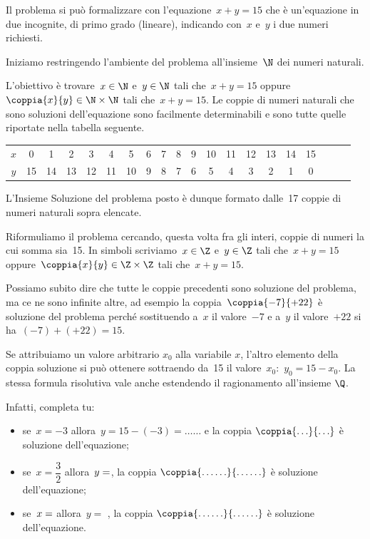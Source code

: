 \begin{soluzione}
Il problema si può formalizzare con l'equazione~\(x+y=15\) che è 
un'equazione in due incognite, di primo grado (lineare), 
indicando con~\(x\) e~\(y\) i due numeri richiesti.

Iniziamo restringendo l'ambiente del problema all'insieme~\(\N\) dei numeri 
naturali.

L'obiettivo è trovare~\(x\in\N\) e~\(y\in\N\) tali che~\(x+y=15\) 
oppure~\(\coppia{x}{y}\in\N\times\N\) tali che~\(x+y=15\).
Le coppie di numeri naturali che sono soluzioni
dell'equazione sono facilmente determinabili e sono
tutte quelle riportate nella tabella seguente.

{\small
\begin{tabular}{cccccccccccccccccccc}
\toprule
\(x\) & 0 & 1 & 2 & 3 & 4 & 5 & 6 & 7 & 8 & 9 & 10 & 11 & 12 & 13 & 
14 & 15\\
\(y\) & 15 & 14 & 13 & 12 & 11 & 10 & 9 & 8 & 7 & 6 & 5 & 4 & 3 & 
2 & 1 & 0\\
\bottomrule
\end{tabular}
}

L'Insieme Soluzione del problema posto è dunque
formato dalle~17 coppie di numeri naturali sopra elencate.

Riformuliamo il problema cercando, questa volta fra gli interi,
coppie di numeri la cui somma sia~15.
In simboli scriviamo~\(x\in\Z\) e~\(y\in\Z\) tali che~\(x+y=15\)
oppure~\(\coppia{x}{y}\in\Z\times\Z\) tali che~\(x+y=15\).

Possiamo subito dire che tutte le coppie precedenti sono soluzione del
problema, ma ce ne sono infinite altre, ad esempio la 
coppia~\(\coppia{-7}{+22}\) è 
soluzione del problema perché sostituendo a~\(x\) il
valore~\(-7\) e a~\(y\) il valore~\(+22\) si ha~\((-7)+(+22)=15\).

Se attribuiamo un valore arbitrario \(x_0\) alla variabile \(x\), l'altro
elemento della coppia soluzione si può ottenere sottraendo da~15 il
valore~\(x_0\):~\(y_0=15-x_0\). La stessa formula risolutiva vale anche
estendendo il ragionamento all'insieme \(\Q\).

Infatti, completa tu:

\begin{itemize} [nosep]
\item se~\(x=-3\) allora~\(y=15-(-3)=\ldots\ldots\) e la coppia 
\(\coppia{\ldots}{\ldots}\) è soluzione dell'equazione;
\item se~\(x=\dfrac{3}{2}\) allora~\(y =\dotfill\), la coppia 
\(\coppia{\ldots\ldots}{\ldots\ldots}\) è soluzione dell'equazione;
\item se~\(x =\dotfill\) allora~\(y=\) \dotfill, la coppia 
\(\coppia{\ldots\ldots}{\ldots\ldots}\) è soluzione dell'equazione.
\end{itemize}


\end{soluzione}
